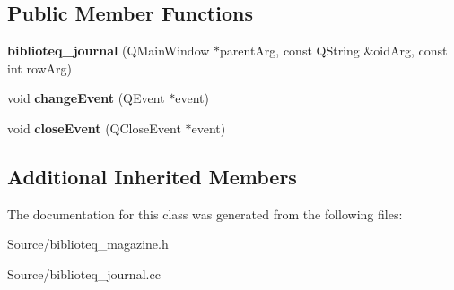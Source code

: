 \subsection*{Public Member Functions}
\begin{DoxyCompactItemize}
\item 
{\bfseries biblioteq\+\_\+journal} (Q\+Main\+Window $\ast$parent\+Arg, const Q\+String \&oid\+Arg, const int row\+Arg)\hypertarget{classbiblioteq__journal_a38aed34a81ec9d4e28461bf430df9d3e}{}\label{classbiblioteq__journal_a38aed34a81ec9d4e28461bf430df9d3e}

\item 
void {\bfseries change\+Event} (Q\+Event $\ast$event)\hypertarget{classbiblioteq__journal_a8ad8e85e674b7a5012d71a49fe9e6eee}{}\label{classbiblioteq__journal_a8ad8e85e674b7a5012d71a49fe9e6eee}

\item 
void {\bfseries close\+Event} (Q\+Close\+Event $\ast$event)\hypertarget{classbiblioteq__journal_a0099d00efd5be69fb2632493d50b5838}{}\label{classbiblioteq__journal_a0099d00efd5be69fb2632493d50b5838}

\end{DoxyCompactItemize}
\subsection*{Additional Inherited Members}


The documentation for this class was generated from the following files\+:\begin{DoxyCompactItemize}
\item 
Source/biblioteq\+\_\+magazine.\+h\item 
Source/biblioteq\+\_\+journal.\+cc\end{DoxyCompactItemize}
